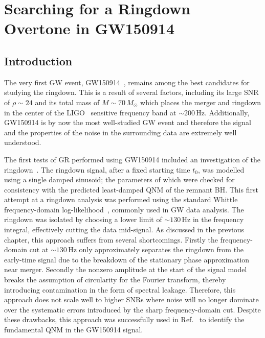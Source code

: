 

\chapter{Searching for a Ringdown Overtone in GW150914}

\label{Chapter4}

\section{Introduction}\label{ch4:sec:introduction}

The very first GW event, GW150914~\cite{LIGOScientific:2016aoc}, remains among the best candidates for studying the ringdown.
This is a result of several factors, including its large SNR of $\rho\sim 24$ and its total mass of $M\sim 70\,M_\odot$ which places the merger and ringdown in the center of the LIGO~\cite{LIGOScientific:2014pky} sensitive frequency band at $\sim 200\,\mathrm{Hz}$. 
Additionally, GW150914 is by now the most well-studied GW event and therefore the signal and the properties of the noise in the surrounding data are extremely well understood.

The first tests of GR performed using GW150914 included an investigation of the ringdown~\cite{LIGOScientific:2016lio}. 
The ringdown signal, after a fixed starting time $t_0$, was modelled using a single damped sinusoid; the parameters of which were checked for consistency with the predicted least-damped QNM of the remnant BH.
This first attempt at a ringdown analysis was performed using the standard Whittle frequency-domain log-likelihood~\cite{10.2307/2983994}, commonly used in GW data analysis.
The ringdown was isolated by choosing a lower limit of $\sim 130\, \mathrm{Hz}$ in the frequency integral, effectively cutting the data mid-signal.
As discussed in the previous chapter, this approach suffers from several shortcomings. 
Firstly the frequency-domain cut at $\sim 130\, \mathrm{Hz}$ only approximately separates the ringdown from the early-time signal due to the breakdown of the stationary phase approximation near merger. 
Secondly the nonzero amplitude at the start of the signal model breaks the assumption of circularity for the Fourier transform, thereby introducing contamination in the form of spectral leakage. 
Therefore, this approach does not scale well to higher SNRs where noise will no longer dominate over the systematic errors introduced by the sharp frequency-domain cut.
Despite these drawbacks, this approach was successfully used in Ref.~\cite{LIGOScientific:2016lio} to identify the fundamental QNM in the GW150914 signal.

